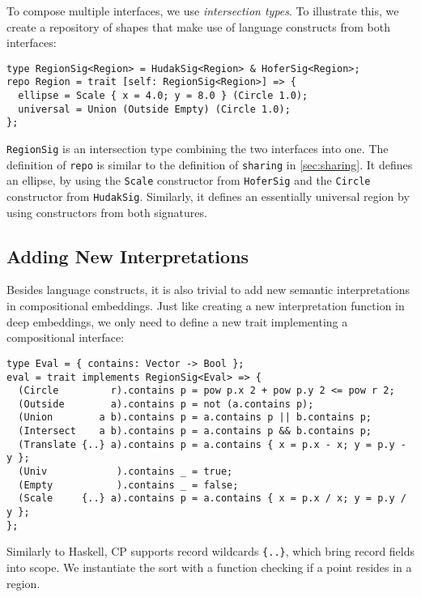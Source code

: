 \noindent
To compose multiple interfaces, we use \emph{intersection types}. To illustrate
this, we create a repository of shapes that make use of language constructs from
both interfaces:

\begin{lstlisting}
type RegionSig<Region> = HudakSig<Region> & HoferSig<Region>;
repo Region = trait [self: RegionSig<Region>] => {
  ellipse = Scale { x = 4.0; y = 8.0 } (Circle 1.0);
  universal = Union (Outside Empty) (Circle 1.0);
};
\end{lstlisting}

\noindent
\lstinline{RegionSig} is an intersection type combining the two interfaces into
one. The definition of \lstinline{repo} is similar to the definition of
\lstinline{sharing} in \autoref{sec:sharing}. It defines an ellipse, by using
the \lstinline{Scale} constructor from \lstinline{HoferSig} and the
\lstinline{Circle} constructor from \lstinline{HudakSig}. Similarly, it defines
an essentially universal region by using constructors from both signatures.

\subsection{Adding New Interpretations} \label{sec:semantics}

Besides language constructs, it is also trivial to add new semantic
interpretations in compositional embeddings. Just like creating a new
interpretation function in deep embeddings, we only need to define a new trait
implementing a compositional interface:

\begin{lstlisting}
type Eval = { contains: Vector -> Bool };
eval = trait implements RegionSig<Eval> => {
  (Circle         r).contains p = pow p.x 2 + pow p.y 2 <= pow r 2;
  (Outside        a).contains p = not (a.contains p);
  (Union        a b).contains p = a.contains p || b.contains p;
  (Intersect    a b).contains p = a.contains p && b.contains p;
  (Translate {..} a).contains p = a.contains { x = p.x - x; y = p.y - y };
  (Univ            ).contains _ = true;
  (Empty           ).contains _ = false;
  (Scale     {..} a).contains p = a.contains { x = p.x / x; y = p.y / y };
};
\end{lstlisting}

\noindent
Similarly to Haskell, CP supports record wildcards \lstinline|{..}|, which bring
record fields into scope. We instantiate the sort with a function checking if a
point resides in a region.

